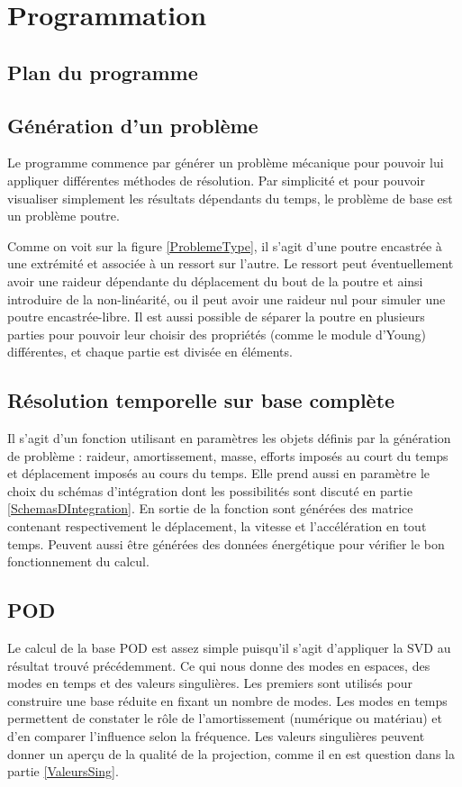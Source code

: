 \documentclass[12pt,a4paper]{report}
\begin{document}
\chapter{Programmation}


\section{Plan du programme}


\clearpage

\section{Génération d'un problème}
Le programme commence par générer un problème mécanique pour pouvoir lui appliquer différentes méthodes de résolution. Par simplicité et pour pouvoir visualiser simplement les résultats dépendants du temps, le problème de base est un problème poutre. 


Comme on voit sur la figure \ref{ProblemeType}, il s'agit d'une poutre encastrée à une extrémité et associée à un ressort sur l'autre. Le ressort peut éventuellement avoir une raideur dépendante du déplacement du bout de la poutre et ainsi introduire de la non-linéarité, ou il peut avoir une raideur nul pour simuler une poutre encastrée-libre. Il est aussi possible de séparer la poutre en plusieurs parties pour pouvoir leur choisir des propriétés (comme le module d'Young) différentes, et chaque partie est divisée en éléments.

\section{Résolution temporelle sur base complète}
Il s'agit d'un fonction utilisant en paramètres les objets définis par la génération de problème : raideur, amortissement, masse, efforts imposés au court du temps et déplacement imposés au cours du temps. Elle prend aussi en paramètre le choix du schémas d'intégration dont les possibilités sont discuté en partie \ref{SchemasDIntegration}. En sortie de la fonction sont générées des matrice contenant respectivement le déplacement, la vitesse et l'accélération en tout temps. Peuvent aussi être générées des données énergétique pour vérifier le bon fonctionnement du calcul.

\section{POD}
Le calcul de la base POD est assez simple puisqu'il s'agit d'appliquer la SVD au résultat trouvé précédemment. Ce qui nous donne des modes en espaces, des modes en temps et des valeurs singulières. Les premiers sont utilisés pour construire une base réduite en fixant un nombre de modes. Les modes en temps permettent de constater le rôle de l'amortissement (numérique ou matériau) et d'en comparer l'influence selon la fréquence. Les valeurs singulières peuvent donner un aperçu de la qualité de la projection, comme il en est question dans la partie \ref{ValeursSing}.
\end{document}
